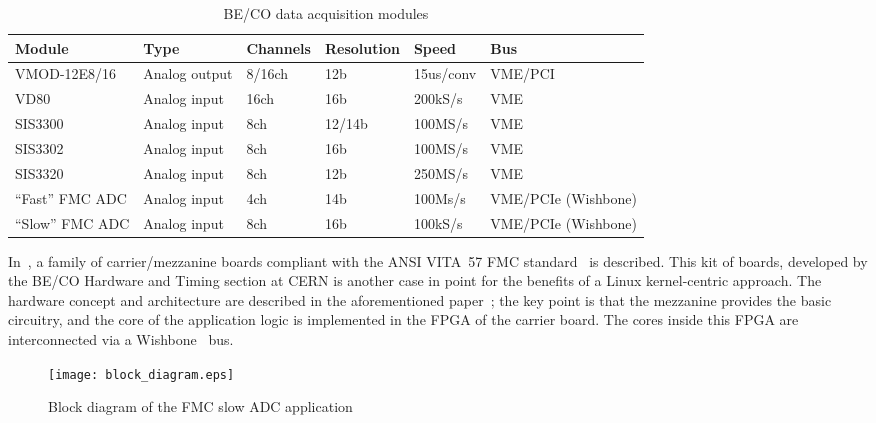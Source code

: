 \documentclass{JAC2003}
\begin{document}
\begin{table*}[bt]
   \centering
   \caption{BE/CO data acquisition modules}
   \begin{tabular}{llllll}
       \toprule
	\textbf{Module}& \textbf{Type}& \textbf{Channels}& 
	\textbf{Resolution}& \textbf{Speed}& \textbf{Bus} \\ 
       \midrule
	VMOD-12E8/16    & Analog output& 8/16ch& 12b   & 15us/conv& VME/PCI  \\
	VD80            & Analog input & 16ch  & 16b   & 200kS/s&   VME  \\
	SIS3300         & Analog input & 8ch   & 12/14b& 100MS/s&   VME  \\
	SIS3302         & Analog input & 8ch   & 16b   & 100MS/s&   VME  \\
	SIS3320         & Analog input & 8ch   & 12b   & 250MS/s&   VME  \\
	``Fast'' FMC ADC& Analog input & 4ch   & 14b   & 100Ms/s&   VME/PCIe (Wishbone)  \\
	``Slow'' FMC ADC& Analog input & 8ch   & 16b   & 100kS/s&   VME/PCIe (Wishbone)  \\
       \bottomrule
   \end{tabular}
   \label{zio-modules}
\end{table*}

In~\cite{fpga-fmc}, a family of carrier/mezzanine boards compliant 
with the ANSI VITA~57 FMC standard~\cite{vita-fmc} is described. This kit of boards,
developed by the BE/CO Hardware and Timing section at CERN is
another case in point for the benefits of a Linux kernel-centric
approach. The hardware concept and architecture are described
in the aforementioned paper~\cite{fpga-fmc}; the key point is that the
mezzanine provides the basic circuitry, and the core of the application
logic is implemented in the FPGA of the carrier board. The cores inside
this FPGA are interconnected via a Wishbone~\cite{wishbone-spec} bus.

\begin{figure}[tb]
   \centering
   \texttt{[image: block\_diagram.eps]}
   \caption{Block diagram of the FMC slow ADC application}
   \label{slow-adc}
\end{figure}
\end{document}
